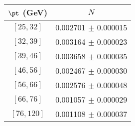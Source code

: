 \begin{tabular}{c||c}
$\pt$ (GeV) & $N$  \\
\hline
$[25, 32]$ & 0.002701 $\pm$ 0.000015\\
$[32, 39]$ & 0.003164 $\pm$ 0.000023\\
$[39, 46]$ & 0.003658 $\pm$ 0.000035\\
$[46, 56]$ & 0.002467 $\pm$ 0.000030\\
$[56, 66]$ & 0.002576 $\pm$ 0.000048\\
$[66, 76]$ & 0.001057 $\pm$ 0.000029\\
$[76, 120]$ & 0.001108 $\pm$ 0.000037\\
\end{tabular}

